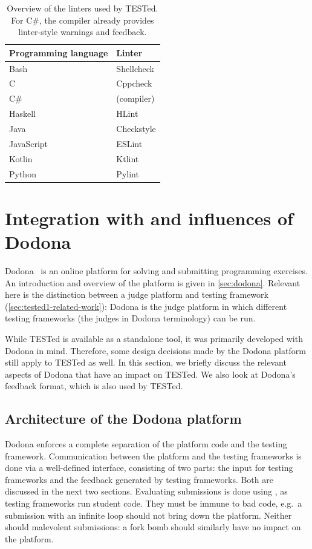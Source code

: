 \documentclass[../main]{subfiles}
\begin{document}
\begin{table}[h]
    \centering
    \caption{
        Overview of the linters used by TESTed.
        For C\#, the compiler already provides linter-style warnings and feedback.
    }
    \label{tab:linters}
    \begin{tabular}{|l|l|}
        \hline
        Programming language & Linter \\
        \hline
        Bash & Shellcheck  \\
        C & Cppcheck \\
        C\# & (compiler) \\
        Haskell & HLint \\
        Java & Checkstyle \\
        JavaScript & ESLint \\
        Kotlin & Ktlint \\
        Python & Pylint \\
        \hline
    \end{tabular}
\end{table}

\section{Integration with and influences of Dodona}\label{sec:tested-and-dodona}

Dodona~\autocite{vanpetegemDodonaLearnCode2023} is an online platform for solving and submitting programming exercises.
An introduction and overview of the platform is given in \cref{sec:dodona}.
Relevant here is the distinction between a judge platform and testing framework (\cref{sec:tested1-related-work}): Dodona is the judge platform in which different testing frameworks (the judges in Dodona terminology) can be run.

While TESTed is available as a standalone tool, it was primarily developed with Dodona in mind.
Therefore, some design decisions made by the Dodona platform still apply to TESTed as well.
In this section, we briefly discuss the relevant aspects of Dodona that have an impact on TESTed.
We also look at Dodona's feedback format, which is also used by TESTed.

\subsection{Architecture of the Dodona platform}\label{subsec:dodona-architecture}

Dodona enforces a complete separation of the platform code and the testing framework.
Communication between the platform and the testing frameworks is done via a well-defined interface, consisting of two parts: the input for testing frameworks and the feedback generated by testing frameworks.
Both are discussed in the next two sections.
Evaluating submissions is done using , as testing frameworks run student code.
They must be immune to bad code, e.g.\ a submission with an infinite loop should not bring down the platform.
Neither should malevolent submissions: a fork bomb should similarly have no impact on the platform.
\end{document}
